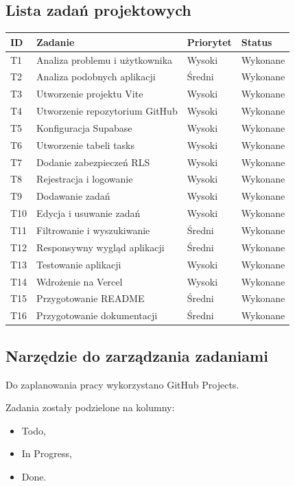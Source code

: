 \documentclass[12pt,a4paper]{article}
\begin{document}
\subsection{Lista zadań projektowych}

\begin{longtable}{|p{1.2cm}|p{8.7cm}|p{2cm}|p{2.2cm}|}
\hline
\textbf{ID} &
\textbf{Zadanie} &
\textbf{Priorytet} &
\textbf{Status} \\
\hline
T1 & Analiza problemu i użytkownika & Wysoki & Wykonane \\
\hline
T2 & Analiza podobnych aplikacji & Średni & Wykonane \\
\hline
T3 & Utworzenie projektu Vite & Wysoki & Wykonane \\
\hline
T4 & Utworzenie repozytorium GitHub & Wysoki & Wykonane \\
\hline
T5 & Konfiguracja Supabase & Wysoki & Wykonane \\
\hline
T6 & Utworzenie tabeli tasks & Wysoki & Wykonane \\
\hline
T7 & Dodanie zabezpieczeń RLS & Wysoki & Wykonane \\
\hline
T8 & Rejestracja i logowanie & Wysoki & Wykonane \\
\hline
T9 & Dodawanie zadań & Wysoki & Wykonane \\
\hline
T10 & Edycja i usuwanie zadań & Wysoki & Wykonane \\
\hline
T11 & Filtrowanie i wyszukiwanie & Średni & Wykonane \\
\hline
T12 & Responsywny wygląd aplikacji & Średni & Wykonane \\
\hline
T13 & Testowanie aplikacji & Wysoki & Wykonane \\
\hline
T14 & Wdrożenie na Vercel & Wysoki & Wykonane \\
\hline
T15 & Przygotowanie README & Średni & Wykonane \\
\hline
T16 & Przygotowanie dokumentacji & Średni & Wykonane \\
\hline
\end{longtable}

\subsection{Narzędzie do zarządzania zadaniami}

Do zaplanowania pracy wykorzystano GitHub Projects.

Zadania zostały podzielone na kolumny:

\begin{itemize}[leftmargin=*]
    \item Todo,
    \item In Progress,
    \item Done.
\end{itemize}
\end{document}
